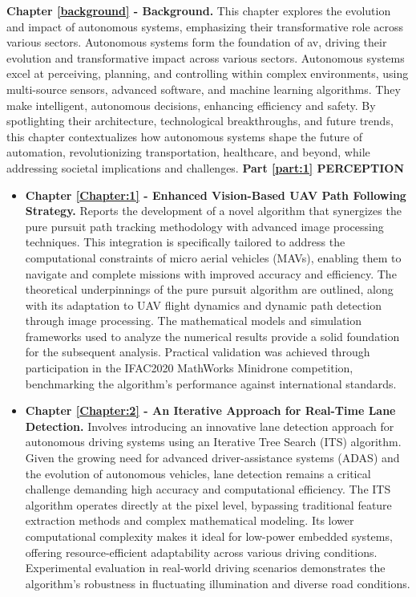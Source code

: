 \textbf{Chapter \textcolor{red}{\ref{background}} - Background. \newline} This chapter explores the evolution and impact of autonomous systems, emphasizing their transformative role across various sectors. Autonomous systems form the foundation of \gls{av}, driving their evolution and transformative impact across various sectors. Autonomous systems excel at perceiving, planning, and controlling within complex environments, using multi-source sensors, advanced software, and machine learning algorithms. They make intelligent, autonomous decisions, enhancing efficiency and safety. By spotlighting their architecture, technological breakthroughs, and future trends, this chapter contextualizes how autonomous systems shape the future of automation, revolutionizing transportation, healthcare, and beyond, while addressing societal implications and challenges. \newline \newline
\textbf{Part \textcolor{red}{\ref{part:1}} PERCEPTION} 
\begin{itemize}
	\item \textbf{Chapter \textcolor{red}{\ref{Chapter:1}} - Enhanced Vision-Based UAV Path Following Strategy. \newline }
	Reports  the development of a novel algorithm that synergizes the pure pursuit path tracking methodology with advanced image processing techniques. This integration is specifically tailored to address the computational constraints of micro aerial vehicles (MAVs), enabling them to navigate and complete missions with improved accuracy and efficiency. The theoretical underpinnings of the pure pursuit algorithm are outlined, along with its adaptation to UAV flight dynamics and dynamic path detection through image processing. The mathematical models and simulation frameworks used to analyze the numerical results provide a solid foundation for the subsequent analysis. Practical validation was achieved through participation in the IFAC2020 MathWorks Minidrone competition, benchmarking the algorithm's performance against international standards.
	\item \textbf{Chapter \textcolor{red}{\ref{Chapter:2}} - An Iterative Approach for Real-Time Lane Detection. \newline } 
	Involves introducing an innovative lane detection approach for autonomous driving systems using an Iterative Tree Search (ITS) algorithm. Given the growing need for advanced driver-assistance systems (ADAS) and the evolution of autonomous vehicles, lane detection remains a critical challenge demanding high accuracy and computational efficiency. The ITS algorithm operates directly at the pixel level, bypassing traditional feature extraction methods and complex mathematical modeling. Its lower computational complexity makes it ideal for low-power embedded systems, offering resource-efficient adaptability across various driving conditions. Experimental evaluation in real-world driving scenarios demonstrates the algorithm's robustness in fluctuating illumination and diverse road conditions.
\end{itemize}

